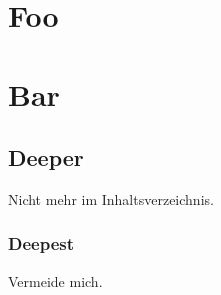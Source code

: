 \section{Foo}
\lipsum[5-12]

\section{Bar}
\lipsum[12-18]

\subsection{Deeper}
Nicht mehr im Inhaltsverzeichnis.

\subsubsection{Deepest}
Vermeide mich.